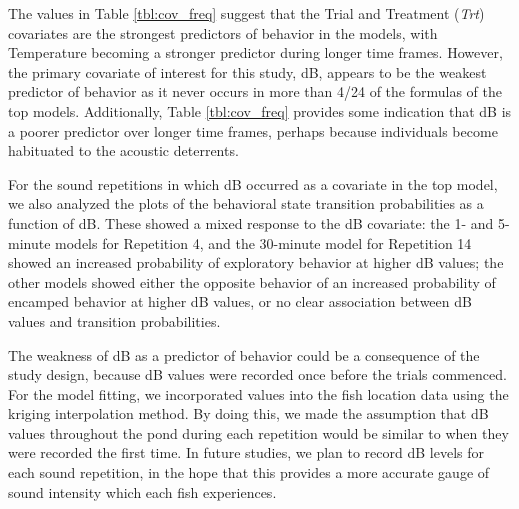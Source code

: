 \documentclass[12pt]{article}
\begin{document}
	The values in Table \ref{tbl:cov_freq} suggest that the Trial and Treatment (\emph{Trt}) covariates are the strongest predictors of behavior in the models, with Temperature becoming a stronger predictor during longer time frames. However, the primary covariate of interest for this study, dB, appears to be the weakest predictor of behavior as it never occurs in more than 4/24 of the formulas of the top models. Additionally, Table \ref{tbl:cov_freq} provides some indication that dB is a poorer predictor over longer time frames, perhaps because individuals become habituated to the acoustic deterrents. 
	
	For the sound repetitions in which dB occurred as a covariate in the top model, we also analyzed the plots of the behavioral state transition probabilities as a function of dB. These showed a mixed response to the dB covariate: the 1- and 5-minute models for Repetition 4, and the 30-minute model for Repetition 14 showed an increased probability of exploratory behavior at higher dB values; the other models showed either the opposite behavior of an increased probability of encamped behavior at higher dB values, or no clear association between dB values and transition probabilities.
	
	The weakness of dB as a predictor of behavior could be a consequence of the study design, because dB values were recorded once before the trials commenced. For the model fitting, we incorporated values into the fish location data using the kriging interpolation method. By doing this, we made the assumption that dB values throughout the pond during each repetition would be similar to when they were recorded the first time. In future studies, we plan to record dB levels for each sound repetition, in the hope that this provides a more accurate gauge of sound intensity which each fish experiences.
	
	
	
	
\end{document}
